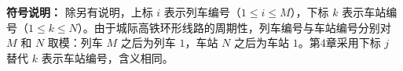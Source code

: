 \textbf{符号说明：} 除另有说明，上标 $i$ 表示列车编号（$1 \leq i \leq M$），下标 $k$ 表示车站编号（$1 \leq k \leq N$）。由于城际高铁环形线路的周期性，列车编号与车站编号分别对 $M$ 和 $N$ 取模：列车 $M$ 之后为列车 $1$，车站 $N$ 之后为车站 $1$。第4章采用下标 $j$ 替代 $k$ 表示车站编号，含义相同。

